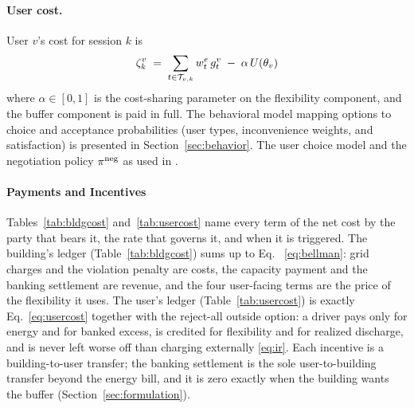 \paragraph{User cost.} User $v$'s cost for session $k$ is
\begin{equation}\label{eq:usercost}
\begin{aligned}
\zeta_{k}^{v} \;=\; \sum_{t \in \mathcal{T}_{v,k}} w_{t}^{e}\,g_{t}^{v}
 \;-\; \alpha\, U(\theta_v)
\end{aligned}
\end{equation}
where $\alpha \in [0,1]$ is the cost-sharing parameter on the flexibility component, and the buffer component is paid in full. The behavioral model mapping options to choice and acceptance probabilities (user types, inconvenience weights, and satisfaction) is presented in Section~\ref{sec:behavior}. The user choice model and the negotiation policy $\pi^{\mathrm{neg}}$ as used in \cite{sen2026negotiations}.





\paragraph{Payments and Incentives} Tables~\ref{tab:bldgcost} and~\ref{tab:usercost} name every term of the net cost by the party that bears it, the rate that governs it, and when it is triggered. The building's ledger (Table~\ref{tab:bldgcost}) sums up to Eq.~ \eqref{eq:bellman}: grid charges and the violation penalty are costs, the capacity payment and the banking settlement are revenue, and the four user-facing terms are the price of the flexibility it uses. The user's ledger (Table~\ref{tab:usercost}) is exactly Eq.~\eqref{eq:usercost} together with the reject-all outside option: a driver pays only for energy and for banked excess, is credited for flexibility and for realized discharge, and is never left worse off than charging externally \eqref{eq:ir}. Each incentive is a building-to-user transfer; the banking settlement is the sole user-to-building transfer beyond the energy bill, and it is zero exactly when the building wants the buffer (Section~\ref{sec:formulation}).








